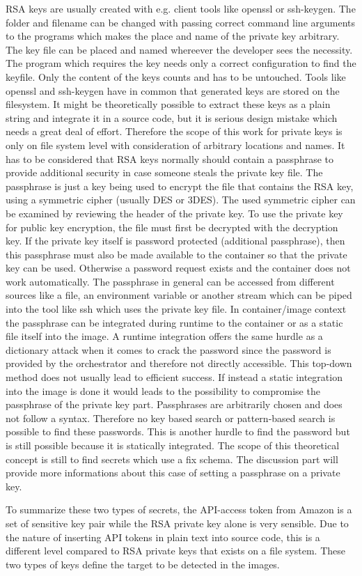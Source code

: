 RSA keys are usually created with e.g. client tools like openssl or ssh-keygen. The folder and filename can be changed with passing correct command line arguments to the programs which makes the place and name of the private key arbitrary. The key file can be placed and named whereever the developer sees the necessity. The program which requires the key needs only a correct configuration to find the keyfile. Only the content of the keys counts and has to be untouched. 
Tools like openssl and ssh-keygen have in common that generated keys are stored on the filesystem. It might be theoretically possible to extract these keys as a plain string and integrate it in a source code, but it is serious design mistake which needs a great deal of effort. Therefore the scope of this work for private keys is only on file system level with consideration of arbitrary locations and names.
It has to be considered that RSA keys normally should contain a passphrase to provide additional security in case someone steals the private key file. The passphrase is just a key being used to encrypt the file that contains the RSA key, using a symmetric cipher (usually DES or 3DES). The used symmetric cipher can be examined by reviewing the header of the private key. To use the private key for public key encryption, the file must first be decrypted with the decryption key.
If the private key itself is password protected (additional passphrase), then this passphrase must also be made available to the container so that the private key can be used. Otherwise a password request exists and the container does not work automatically. 
The passphrase in general can be accessed from different sources like a file, an environment variable or another stream which can be piped into the tool like ssh which uses the private key file.
In container/image context the passphrase can be integrated during runtime to the container or as a static file itself into the image. A runtime integration offers the same hurdle as a dictionary attack when it comes to crack the password since the password is provided by the orchestrator and therefore not directly accessible. This top-down method does not usually lead to efficient success. If instead a static integration into the image is done it would leads to the possibility to compromise the passphrase of the private key part. 
Passphrases are arbitrarily chosen and does not follow a syntax. Therefore no key based search or pattern-based search is possible to find these passwords. This is another hurdle to find the password but is still possible because it is statically integrated. The scope of this theoretical concept is still to find secrets which use a fix schema. The discussion part will provide more informations about this case of setting a passphrase on a private key.

To summarize these two types of secrets, the API-access token from Amazon is a set of sensitive key pair while the RSA private key alone is very sensible. 
Due to the nature of inserting API tokens in plain text into source code, this is a different level compared to RSA private keys that exists on a file system.
These two types of keys define the target to be detected in the images.

